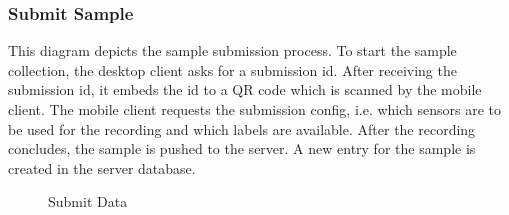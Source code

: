 \subsubsection{Submit Sample}
This diagram depicts the sample submission process. To start the sample collection, the desktop client asks for a submission id. After receiving the submission id, it embeds the id to a QR code which is scanned by the mobile client. The mobile client requests the submission config, i.e. which sensors are to be used for the recording and which labels are available. After the recording concludes, the sample is pushed to the server. A new entry for the sample is created in the server database.
\begin{figure}[!htb]
    \centering
    \caption{Submit Data}
    \label{fig:seq-workspace-submit-data}
\end{figure}

